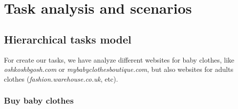 \section{Task analysis and scenarios}

\subsection{Hierarchical tasks model}

For create our tasks, we have analyze different websites for baby clothes, like \textit{oshkoshbgosh.com} or \textit{mybabyclothesboutique.com}, but also websites for adults clothes (\textit{fashion.warehouse.co.uk}, etc).

\subsubsection{Buy baby clothes}
